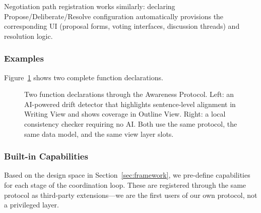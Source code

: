 \noindent Negotiation path registration works similarly: declaring Propose/Deliberate/Resolve configuration automatically provisions the corresponding UI (proposal forms, voting interfaces, discussion threads) and resolution logic.


\subsubsection{Examples}

Figure~\ref{fig:protocol-examples} shows two complete function declarations.

\begin{figure}[t]
\centering
{}
\caption{Two function declarations through the Awareness Protocol. Left: an AI-powered drift detector that highlights sentence-level alignment in Writing View and shows coverage in Outline View. Right: a local consistency checker requiring no AI. Both use the same protocol, the same data model, and the same view layer slots.}
\label{fig:protocol-examples}
\end{figure}


\subsubsection{Built-in Capabilities}
\label{sec:built-in}

Based on the design space in Section~\ref{sec:framework}, we pre-define capabilities for each stage of the coordination loop. These are registered through the same protocol as third-party extensions---we are the first users of our own protocol, not a privileged layer.

